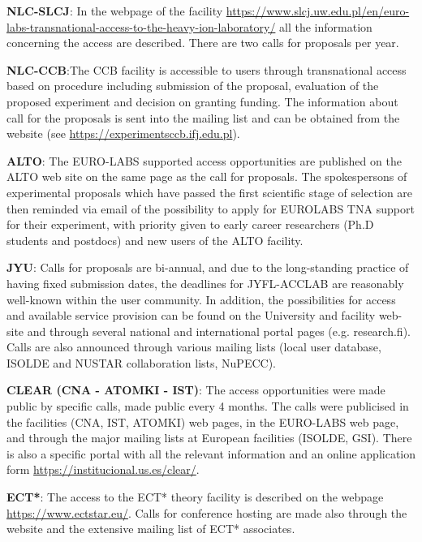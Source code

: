 \textbf{NLC-SLCJ}: In the webpage of the facility \url{https://www.slcj.uw.edu.pl/en/euro-labs-transnational-access-to-the-heavy-ion-laboratory/} all the information concerning the access are described. There are two calls for proposals per year.



\textbf{NLC-CCB}:The CCB facility is accessible to users through transnational access based on procedure including submission of the proposal, evaluation of the proposed experiment and decision on granting funding. The information about call for the proposals is sent into the mailing list and can be obtained from the website (see \url{https://experimentsccb.ifj.edu.pl}).



\textbf{ALTO}: The EURO-LABS supported access opportunities are published on the ALTO web site on the same page as the call for proposals. The spokespersons of experimental proposals which have passed the first scientific stage of selection are then reminded via email of the possibility to apply for EUROLABS TNA support for their experiment, with priority given to early career researchers (Ph.D students and postdocs) and new users of the ALTO facility. 

\textbf{JYU}: Calls for proposals are bi-annual, and due to the long-standing practice of having fixed submission dates, the deadlines for JYFL-ACCLAB are reasonably well-known within the user community. In addition, the possibilities for access and available service provision can be found on the University and facility web-site and through several national and international portal pages (e.g. research.fi). Calls are also announced through various mailing lists (local user database, ISOLDE and NUSTAR collaboration lists, NuPECC).


\textbf{CLEAR (CNA - ATOMKI - IST)}: The access opportunities were made public by specific calls, made public every 4 months. The calls were publicised in the facilities (CNA, IST, ATOMKI) web pages, in the EURO-LABS web page, and through the major mailing lists at European facilities (ISOLDE, GSI). There is also a specific portal with all the relevant information and an online application form \url{https://institucional.us.es/clear/}.


\textbf{ECT*}: The access to the ECT* theory facility is described on the webpage \url{https://www.ectstar.eu/}. Calls for conference hosting are made also through the website and the extensive mailing list of ECT* associates.

